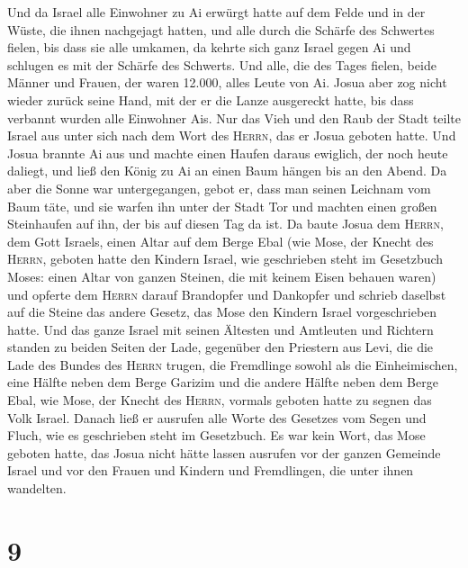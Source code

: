  Und da Israel alle Einwohner zu Ai erwürgt hatte auf dem
Felde und in der Wüste, die ihnen nachgejagt hatten, und alle durch die
Schärfe des Schwertes fielen, bis dass sie alle umkamen, da kehrte sich
ganz Israel gegen Ai und schlugen es mit der Schärfe des Schwerts.
 Und alle, die des Tages fielen, beide Männer und Frauen,
der waren 12.000, alles Leute von Ai.  Josua aber zog
nicht wieder zurück seine Hand, mit der er die Lanze ausgereckt hatte,
bis dass verbannt wurden alle Einwohner Ais.  Nur das
Vieh und den Raub der Stadt teilte Israel aus unter sich nach dem Wort
des \textsc{Herrn}, das er Josua geboten hatte.  Und
Josua brannte Ai aus und machte einen Haufen daraus ewiglich, der noch
heute daliegt,  und ließ den König zu Ai an einen Baum
hängen bis an den Abend. Da aber die Sonne war untergegangen, gebot er,
dass man seinen Leichnam vom Baum täte, und sie warfen ihn unter der
Stadt Tor und machten einen großen Steinhaufen auf ihn, der bis auf
diesen Tag da ist.  Da baute Josua dem \textsc{Herrn},
dem Gott Israels, einen Altar auf dem Berge Ebal  (wie
Mose, der Knecht des \textsc{Herrn}, geboten hatte den Kindern Israel,
wie geschrieben steht im Gesetzbuch Moses: einen Altar von ganzen
Steinen, die mit keinem Eisen behauen waren) und opferte dem
\textsc{Herrn} darauf Brandopfer und Dankopfer  und
schrieb daselbst auf die Steine das andere Gesetz, das Mose den Kindern
Israel vorgeschrieben hatte.  Und das ganze Israel mit
seinen Ältesten und Amtleuten und Richtern standen zu beiden Seiten der
Lade, gegenüber den Priestern aus Levi, die die Lade des Bundes des
\textsc{Herrn} trugen, die Fremdlinge sowohl als die Einheimischen, eine
Hälfte neben dem Berge Garizim und die andere Hälfte neben dem Berge
Ebal, wie Mose, der Knecht des \textsc{Herrn}, vormals geboten hatte zu
segnen das Volk Israel.  Danach ließ er ausrufen alle
Worte des Gesetzes vom Segen und Fluch, wie es geschrieben steht im
Gesetzbuch.  Es war kein Wort, das Mose geboten hatte,
das Josua nicht hätte lassen ausrufen vor der ganzen Gemeinde Israel und
vor den Frauen und Kindern und Fremdlingen, die unter ihnen wandelten.

\hypertarget{section-8}{%
\section{9}\label{section-8}}

